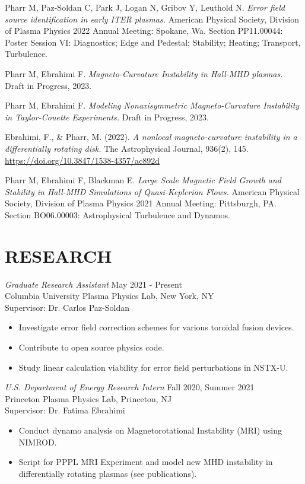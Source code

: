 \documentclass[margin]{rpires}
\begin{document}
\begin{resume}

Pharr M, Paz-Soldan C, Park J, Logan N, Gribov Y, Leuthold N. {\sl Error field source identification in early ITER plasmas.} American Physical Society, Division of Plasma Physics 2022 Annual Meeting: Spokane, Wa. Section PP11.00044: Poster Session VI: Diagnostics; Edge and Pedestal; Stability; Heating; Transport, Turbulence.

Pharr M, Ebrahimi F. {\sl Magneto-Curvature Instability in Hall-MHD plasmas.} Draft in Progress, 2023.

Pharr M, Ebrahimi F. {\sl Modeling Nonaxisymmetric Magneto-Curvature Instability in Taylor-Couette Experiments.} Draft in Progress, 2023.

Ebrahimi, F., \& Pharr, M. (2022). {\sl A nonlocal magneto-curvature instability in a differentially rotating disk.} The Astrophysical Journal, 936(2), 145. \href{https://doi.org/10.3847/1538-4357/ac892d}{https://doi.org/10.3847/1538-4357/ac892d} 

Pharr M, Ebrahimi F, Blackman E. {\sl Large Scale Magnetic Field Growth and Stability in Hall-MHD Simulations of Quasi-Keplerian Flows.} American Physical Society, Division of Plasma Physics 2021 Annual Meeting: Pittsburgh, PA. Section BO06.00003: Astrophysical Turbulence and Dynamos.


\section{RESEARCH}
    {\sl Graduate Research Assistant} \hfill May 2021 - Present \\
    Columbia University Plasma Physics Lab, 
    New York, NY\\ 
    Supervisor: Dr. Carlos Paz-Soldan
    \begin{itemize}  \itemsep -2pt %
    \item Investigate error field correction schemes for various toroidal fusion devices.
    \item Contribute to open source physics code. 
    \item Study linear calculation viability for error field perturbations in NSTX-U. 
    \end{itemize}

    {\sl U.S. Department of Energy Research Intern} \hfill Fall 2020, Summer 2021 \\
    Princeton Plasma Physics Lab, 
    Princeton, NJ\\ 
    Supervisor: Dr. Fatima Ebrahimi
    \begin{itemize}  \itemsep -2pt %
    \item Conduct dynamo analysis on Magnetorotational Instability (MRI) using NIMROD.
    \item Script for PPPL MRI Experiment and model new MHD instability in differentially rotating plasmas (see publications).
    \end{itemize}


\end{resume}
\end{document}
